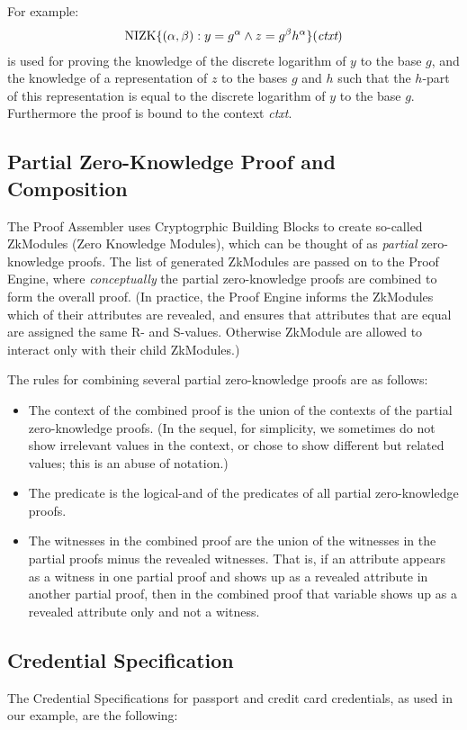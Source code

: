For example:
\begin{align*}
\operatorname{NIZK}\lbrace(\alpha, \beta):
y = g^{ {\alpha}} \wedge z = g^{ {\beta}}h^{ {\alpha}}
\rbrace(\emph{ctxt})
\end{align*}
is used for proving the knowledge of the discrete logarithm of $y$ to the
base $g$, and the knowledge of a representation of $z$ to the bases $g$ and $h$ such that
the $h$-part of this representation is equal to the discrete logarithm of
$y$ to the base $g$. Furthermore the proof is bound to the context \emph{ctxt}.

\subsection{Partial Zero-Knowledge Proof and Composition}
The Proof Assembler uses Cryptogrphic Building Blocks to create so-called ZkModules (Zero Knowledge Modules),
which can be thought of as \emph{partial} zero-knowledge proofs.
The list of generated ZkModules are passed on to the Proof Engine, where \emph{conceptually} the partial zero-knowledge
proofs are combined to form the overall proof. (In practice, the Proof Engine informs the ZkModules which of their
attributes are revealed, and ensures that attributes that are equal are assigned the same R- and S-values. Otherwise
ZkModule are allowed to interact only with their child ZkModules.)

The rules for combining several partial zero-knowledge proofs are as follows:
\begin{itemize}
\item The context of the combined proof is the union of the contexts of the partial zero-knowledge proofs.
(In the sequel, for
simplicity, we sometimes do not show irrelevant values in the context, or chose to show different but related
values; this is an abuse of notation.)
\item The predicate is the logical-and of the predicates of all partial zero-knowledge proofs.
\item The witnesses in the combined proof are the union of the witnesses in the partial proofs minus
the revealed witnesses. That is, if an attribute appears as a witness in one partial proof and shows up
as a revealed attribute in another partial proof, then in the combined proof that variable shows up as
a revealed attribute only and not a witness.
\end{itemize}

\subsection{Credential Specification}
The Credential Specifications for passport and credit card credentials, as used in our example, are the following:
